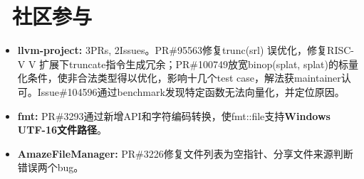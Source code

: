 \documentclass{resume}
\begin{document}
\section{\faGithub\ 社区参与}
\begin{spacing}{1.125}
\begin{itemize}[parsep=0.5ex]
  \item {\large \textbf{llvm-project:}} 3PRs, 2Issues。PR\#95563修复trunc(srl) 误优化，修复RISC-V V 扩展下truncate指令生成冗余；PR\#100749放宽binop(splat, splat)的标量化条件，使非合法类型得以优化，影响十几个test case，解法获maintainer认可。Issue\#104596通过benchmark发现特定函数无法向量化，并定位原因。
  \item {\large \textbf{fmt:}} PR\#3293通过新增API和字符编码转换，使fmt::file支持\textbf{Windows UTF-16文件路径}。
  \item {\large \textbf{AmazeFileManager:}} PR\#3226修复文件列表为空指针、分享文件来源判断错误两个bug。
\end{itemize}
\end{spacing}



\end{document}
